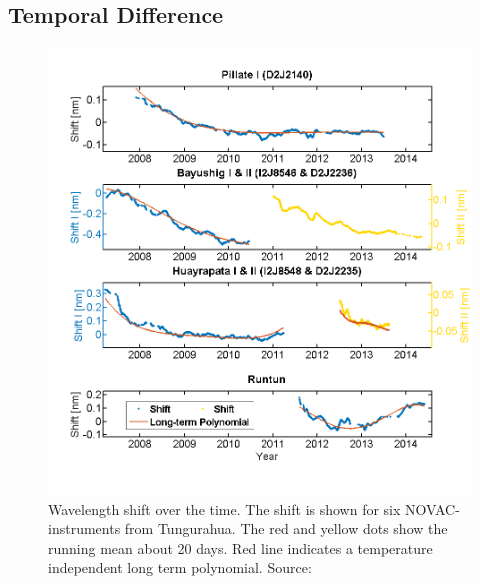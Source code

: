\subsection{Temporal Difference}
%
\begin{figure}
	\centering
	\includegraphics[width=1\linewidth]{Bilder/Simon/Bilder_Tung/Drift_Komplett_NEW}
	\caption{Wavelength shift over the time. The shift is shown for six NOVAC- instruments from Tungurahua. The red and yellow dots show the running mean about 20 days. Red line indicates a temperature independent long term polynomial. Source: \cite{WarnachSimon}}
	\label{fig:driftkomplettnew}
\end{figure}
%

